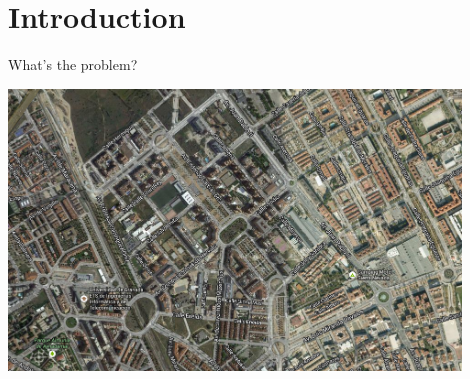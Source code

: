 

\section{Introduction}

\begin{frame}{What's the problem?}



\begin{center} 
   \includegraphics[width=0.9\textwidth]{images/citygrid.png} 
\end{center} 


\end{frame}


